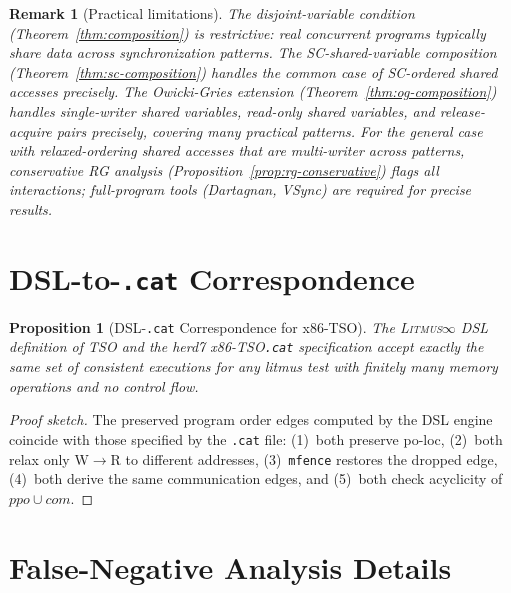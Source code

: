 \documentclass[11pt]{article}
\newcommand{\litmus}{\textsc{Litmus$\infty$}}
\newtheorem{proposition}[theorem]{Proposition}
\newtheorem{remark}{Remark}
\begin{document}
\begin{remark}[Practical limitations]
The disjoint-variable condition (Theorem~\ref{thm:composition}) is
restrictive: real concurrent programs typically share data across
synchronization patterns.
The SC-shared-variable composition (Theorem~\ref{thm:sc-composition})
handles the common case of SC-ordered shared accesses precisely.
The Owicki-Gries extension (Theorem~\ref{thm:og-composition}) handles
single-writer shared variables, read-only shared variables, and
release-acquire pairs precisely, covering many practical patterns.
For the general case with relaxed-ordering shared accesses that are
multi-writer across patterns, conservative RG analysis
(Proposition~\ref{prop:rg-conservative}) flags all interactions;
full-program tools (Dartagnan, VSync) are required for precise results.
\end{remark}

\section{DSL-to-\texttt{.cat} Correspondence}
\label{app:dsl-cat}

\begin{proposition}[DSL-\texttt{.cat} Correspondence for x86-TSO]
\label{prop:dsl-cat}
The \litmus{} DSL definition of TSO and the herd7 x86-TSO\texttt{.cat}
specification accept exactly the same set of consistent executions for
any litmus test with finitely many memory operations and no control flow.
\end{proposition}

\begin{proof}[Proof sketch]
The preserved program order edges computed by the DSL engine coincide
with those specified by the \texttt{.cat} file: (1)~both preserve po-loc,
(2)~both relax only W$\to$R to different addresses,
(3)~\texttt{mfence} restores the dropped edge,
(4)~both derive the same communication edges, and
(5)~both check acyclicity of $\mathit{ppo} \cup \mathit{com}$.
\end{proof}

\section{False-Negative Analysis Details}
\label{app:false-neg-details}
\end{document}

